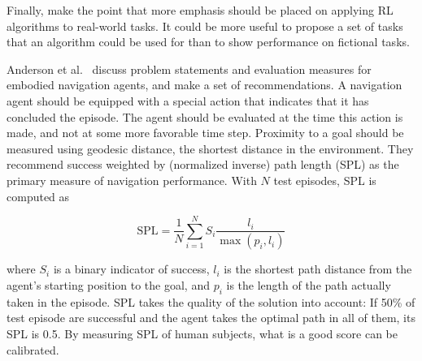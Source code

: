 Finally, \cite{henderson_deep_2018} make the point that more emphasis should be placed on applying RL algorithms to real-world tasks.
It could be more useful to propose a set of tasks that an algorithm could be used for than to show performance on fictional tasks.

Anderson et al.~\cite{anderson_evaluation_2018} discuss problem statements and evaluation measures for embodied navigation agents, and make a set of recommendations.
A navigation agent should be equipped with a special action that indicates that it has concluded the episode.
The agent should be evaluated at the time this action is made, and not at some more favorable time step.
Proximity to a goal should be measured using geodesic distance, the shortest distance in the environment.
They recommend success weighted by (normalized inverse) path length (SPL) as the primary measure of navigation performance.
With \(N\) test episodes, SPL is computed as 

\begin{equation}
    \text{SPL} = \frac{1}{N} \sum_{i=1}^N S_i \frac{l_i}{\max(p_i, l_i)}
    \label{equ:spl}
\end{equation}

where \(S_i\) is a binary indicator of success,
\(l_i\) is the shortest path distance from the agent's starting position to the goal,
and \(p_i\) is the length of the path actually taken in the episode.
SPL takes the quality of the solution into account:
If 50\% of test episode are successful and the agent takes the optimal path in all of them, its SPL is 0.5.
By measuring SPL of human subjects, what is a good score can be calibrated.
